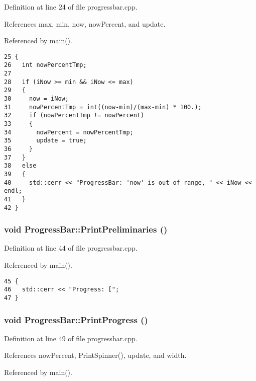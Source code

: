 Definition at line 24 of file progressbar.cpp.

References max, min, now, nowPercent, and update.

Referenced by main().

\begin{Code}\begin{verbatim}25 {
26   int nowPercentTmp;
27   
28   if (iNow >= min && iNow <= max)
29   {
30     now = iNow;
31     nowPercentTmp = int((now-min)/(max-min) * 100.);
32     if (nowPercentTmp != nowPercent)
33     {
34       nowPercent = nowPercentTmp;
35       update = true;
36     }
37   }
38   else
39   {
40     std::cerr << "ProgressBar: 'now' is out of range, " << iNow << endl;
41   }
42 }
\end{verbatim}
\end{Code}


\subsubsection{\setlength{\rightskip}{0pt plus 5cm}void ProgressBar::PrintPreliminaries ()}\label{classProgressBar_c8c63307694b7dda08c866f40120d3d8}




Definition at line 44 of file progressbar.cpp.

Referenced by main().

\begin{Code}\begin{verbatim}45 {
46   std::cerr << "Progress: [";
47 }
\end{verbatim}
\end{Code}


\subsubsection{\setlength{\rightskip}{0pt plus 5cm}void ProgressBar::PrintProgress ()}\label{classProgressBar_1b12b38d231af0f4274015ba3a792ac0}




Definition at line 49 of file progressbar.cpp.

References nowPercent, PrintSpinner(), update, and width.

Referenced by main().

